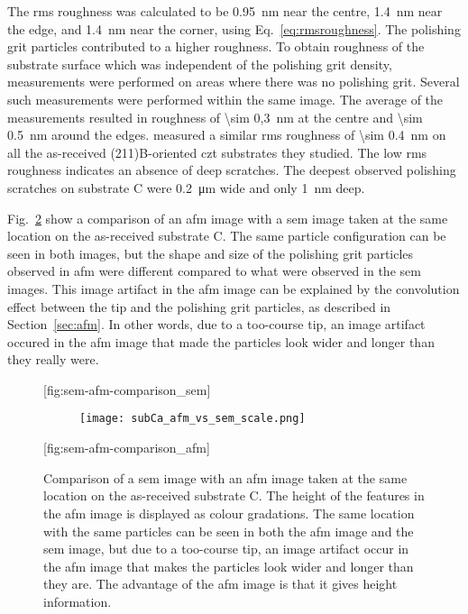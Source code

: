 The \ac{rms} roughness was calculated to be \SI{0.95}{\nano\metre} near the centre, \SI{1.4}{\nano\metre} near the edge, and \SI{1.4}{\nano\metre} near the corner, using Eq.~\ref{eq:rmsroughness}. The polishing grit particles contributed to a higher roughness. To obtain  roughness of the substrate surface which was independent of the polishing grit density, measurements were performed on areas where there was no polishing grit. Several such measurements were performed within the same image. The average of the measurements resulted in  roughness of \SI{\sim 0,3}{\nano\metre} at the centre and \SI{\sim 0.5}{\nano\metre} around the edges. \citet{benson2015as-received} measured a similar \ac{rms} roughness of \SI{\sim 0.4}{\nano\metre} on all the as-received (211)B-oriented \ac{czt} substrates they studied. The low \ac{rms} roughness indicates an absence of deep scratches. The deepest observed polishing scratches on substrate C were \SI{0,2}{\micro\metre} wide and only \SI{1}{\nano\metre} deep. 

Fig.~\ref{fig:sem-afm-comparison} show a comparison of an \ac{afm} image with a \ac{sem} image taken at the same location on the as-received substrate C. The same particle configuration can be seen in both images, but the shape and size of the polishing grit particles observed in \ac{afm} were different compared to what were observed in the \ac{sem} images. This image artifact in the \ac{afm} image can be explained by the convolution effect between the tip and the polishing grit particles, as described in Section~\ref{sec:afm}. In other words, due to a too-course tip, an image artifact occured in the \ac{afm} image that made the particles look wider and longer than they really were. 

\begin{figure}[htbp]
    \centering
    [fig:sem-afm-comparison_sem]
    \hfill\hfill
    \begin{subfigure}[c]{0.04\linewidth}
        \label{fig:subCa_afm_vs_sem_scale}\captionsetup{list=no}
        \texttt{[image: subCa\_afm\_vs\_sem\_scale.png]}
    \end{subfigure}
    \hfill
    [fig:sem-afm-comparison_afm]
    \caption[Comparison of an \ac{afm} image with a \ac{sem} image taken at the same location on substrate C.]{Comparison of  a \ac{sem} image with  an \ac{afm} image taken at the same location on the as-received substrate C. The height of the features in the \ac{afm} image is displayed as colour gradations. The same location with the same particles can be seen in both the \ac{afm} image and the \ac{sem} image, but due to a too-course tip, an image artifact occur in the \ac{afm} image that makes the particles look wider and longer than they are. The advantage of the \ac{afm} image is that it gives height information.}
    \label{fig:sem-afm-comparison}
\end{figure}

